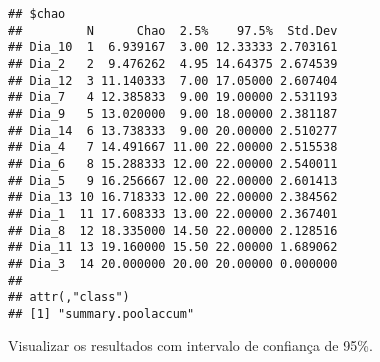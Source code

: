 \documentclass[
]{book}
\begin{document}
\begin{verbatim}
## $chao
##         N      Chao  2.5%    97.5%  Std.Dev
## Dia_10  1  6.939167  3.00 12.33333 2.703161
## Dia_2   2  9.476262  4.95 14.64375 2.674539
## Dia_12  3 11.140333  7.00 17.05000 2.607404
## Dia_7   4 12.385833  9.00 19.00000 2.531193
## Dia_9   5 13.020000  9.00 18.00000 2.381187
## Dia_14  6 13.738333  9.00 20.00000 2.510277
## Dia_4   7 14.491667 11.00 22.00000 2.515538
## Dia_6   8 15.288333 12.00 22.00000 2.540011
## Dia_5   9 16.256667 12.00 22.00000 2.601413
## Dia_13 10 16.718333 12.00 22.00000 2.384562
## Dia_1  11 17.608333 13.00 22.00000 2.367401
## Dia_8  12 18.335000 14.50 22.00000 2.128516
## Dia_11 13 19.160000 15.50 22.00000 1.689062
## Dia_3  14 20.000000 20.00 20.00000 0.000000
## 
## attr(,"class")
## [1] "summary.poolaccum"
\end{verbatim}

Visualizar os resultados com intervalo de confiança de 95\%.
\end{document}

